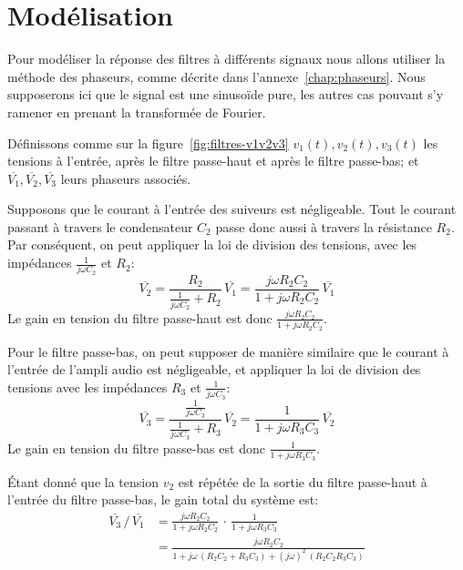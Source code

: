 \section{Modélisation}

Pour modéliser la réponse des filtres à différents signaux nous allons utiliser
la méthode des phaseurs, comme décrite dans l'annexe~\ref{chap:phaseurs}.
Nous supposerons ici que le signal est une sinusoïde pure, les autres cas
pouvant s'y ramener en prenant la transformée de Fourier.

Définissons comme sur la figure~\ref{fig:filtres-v1v2v3}
$v_1(t),v_2(t),v_3(t)$ les tensions
à l'entrée, après le filtre passe-haut et après le filtre passe-bas;
et $\overline{V_1}, \overline{V_2}, \overline{V_3}$ leurs phaseurs associés.

Supposons que le courant à l'entrée des suiveurs est négligeable.
Tout le courant passant à travers le condensateur $C_2$ passe donc
aussi à travers la résistance $R_2$.
Par conséquent, on peut appliquer la loi de division des tensions,
avec les impédances $\frac{1}{j\omega C_2}$ et $R_2$:
\begin{equation}
    \overline{V_2} = \frac{R_2}{\frac{1}{j\omega C_2} + R_2}\,\overline{V_1}
    = \frac{j\omega R_2C_2}{1+j\omega R_2C_2}\,\overline{V_1}
\end{equation}
Le gain en tension du filtre passe-haut est donc
$\frac{j\omega R_2C_2}{1+j\omega R_2C_2}$.

Pour le filtre passe-bas, on peut supposer de manière similaire que
le courant à l'entrée de l'ampli audio est négligeable,
et appliquer la loi de division des tensions avec les impédances
$R_3$ et $\frac{1}{j\omega C_3}$:
\begin{equation}
    \overline{V_3} =
    \frac{\frac{1}{j\omega C_3}}{\frac{1}{j\omega C_3} + R_3}\,\overline{V_2}
    = \frac{1}{1+j\omega R_3C_3}\,\overline{V_2}
\end{equation}
Le gain en tension du filtre passe-bas est donc
$\frac{1}{1 + j\omega R_3C_3}$.

Étant donné que la tension $v_2$ est répétée de la sortie du filtre passe-haut
à l'entrée du filtre passe-bas, le gain total du système est:
\begin{align}
    \overline{V_3}\,/\,\overline{V_1} &=
    \frac{j\omega R_2C_2}{1 + j\omega R_2C_2}\,\cdot\,
    \frac{1}{1 + j\omega R_3C_3}\\
    &= \frac{j\omega R_2C_2}{1 + j\omega\,(R_2C_2+R_3C_3) +
        (j\omega)^2\,(R_2C_2R_3C_3)}
\end{align}

